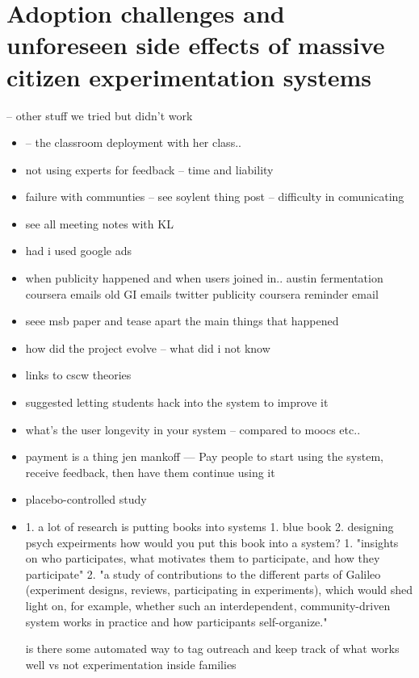 
\chapter{Adoption challenges and unforeseen side effects of massive citizen experimentation systems}
-- other stuff we tried but didn’t work

\begin{itemize}
\item -- the classroom deployment with her class..
\item not using experts for feedback -- time and liability
\item failure with communties  -- see soylent thing post -- difficulty in comunicating 
\item see all meeting notes with KL
\item had i used google ads
\item when publicity happened and when users joined in.. 
    austin fermentation
    coursera emails
    old GI emails
    twitter publicity
    coursera reminder email
\item seee msb paper and tease apart the main things that happened
\item how did the project evolve -- what did i not know
\item links to cscw theories
\item suggested letting students hack into the system to improve it
\item  what’s the user longevity in your system -- compared to moocs etc..
\item payment is a thing 
jen mankoff — Pay people to start using the system, receive feedback, then have them continue using it 
\item placebo-controlled study 
\item 1. a lot of research is putting books into systems
    1. blue book
    2. designing psych expeirments
how would you put this book into a system?
1. "insights on who participates, what motivates them to participate, and how they participate"
2. "a study of contributions to the different parts of Galileo (experiment designs, reviews,   participating in experiments), which would shed light on, for example, whether   such an interdependent, community-driven system works in practice and how   participants self-organize."

is there some automated way to tag outreach and keep track of what works well vs not
experimentation inside families


\end{itemize}
